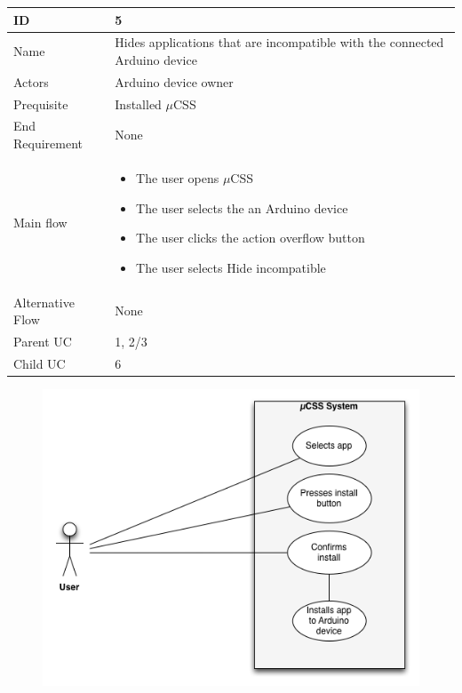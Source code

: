 \begin{table}
        \begin{tabular}{|l|l|}
            \hline
            ID               & 5 \\ \hline
            Name             & Hides applications that are incompatible with the connected Arduino device \\
            Actors           & Arduino device owner \\
            Prequisite       & Installed $\mu$CSS \\
            End Requirement  & None \\
            Main flow 		 & 
            				\begin{itemize}
            				\item{The user opens $\mu$CSS}
            				\item{The user selects the an Arduino device}
            				\item{The user clicks the action overflow button}
            				\item{The user selects Hide incompatible}
            				\end{itemize}\\
            Alternative Flow & None \\
         	Parent UC & 1, 2/3 \\
         	Child UC & 6

        \end{tabular}
    \end{table}

\begin{figure}[H]
\centering
\includegraphics[scale=1]{images/UseCase6}
\end{figure}

